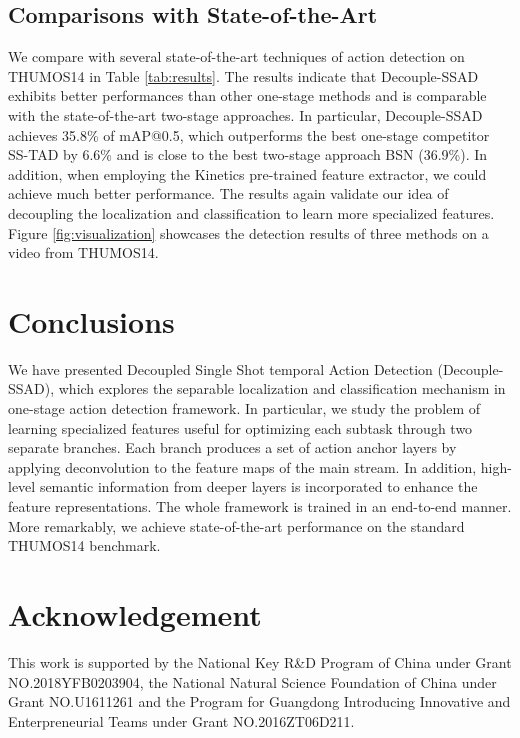 \documentclass{article}
\begin{document}
\subsection{Comparisons with State-of-the-Art}
We compare with several state-of-the-art techniques of action detection on THUMOS14 in Table \ref{tab:results}.
The results indicate that Decouple-SSAD exhibits better performances than other one-stage methods and is comparable with the state-of-the-art two-stage approaches.
In particular, Decouple-SSAD achieves 35.8\% of mAP@0.5, which outperforms the best one-stage competitor SS-TAD by 6.6\% and is close to the best two-stage approach BSN (36.9\%).
In addition, when employing the Kinetics pre-trained feature extractor, we could achieve much better performance.
The results again validate our idea of decoupling the localization and classification to learn more specialized features.
Figure \ref{fig:visualization} showcases the detection results of three methods on a video from THUMOS14.



\section{Conclusions}
We have presented Decoupled Single Shot temporal Action Detection (Decouple-SSAD), which explores the separable localization and classification mechanism in one-stage action detection framework.
In particular, we study the problem of learning specialized features useful for optimizing each subtask through two separate branches.
Each branch produces a set of action anchor layers by applying deconvolution to the feature maps of the main stream.
In addition, high-level semantic information from deeper layers is incorporated to enhance the feature representations. The whole framework is trained in an end-to-end manner.  
More remarkably, we achieve state-of-the-art performance on the standard THUMOS14 benchmark.

\section{Acknowledgement}
This work is supported by the National Key R\&D Program of China under Grant NO.2018YFB0203904, the National Natural Science Foundation of China under Grant NO.U1611261 and the Program for Guangdong Introducing Innovative and Enterpreneurial Teams under Grant NO.2016ZT06D211.


{\small }
\end{document}
